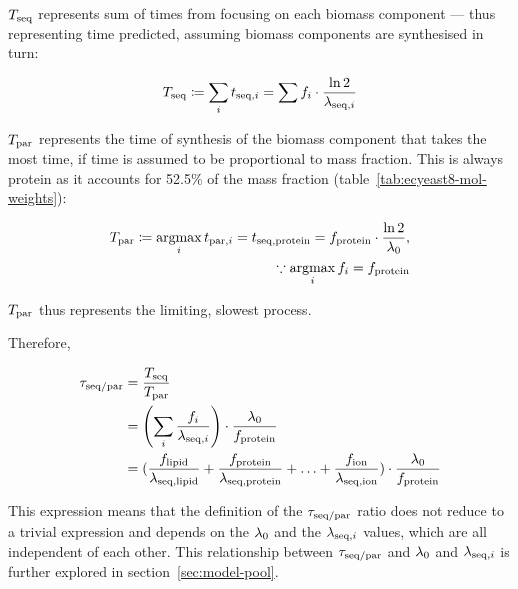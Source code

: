 $T_{\mathrm{seq}}$ represents sum of times from focusing on each biomass component --- thus representing time predicted, assuming biomass components are synthesised in turn:

\begin{equation}
  T_{\mathrm{seq}} \coloneqq \sum_{i} t_{\mathrm{seq},i} = \sum f_{i} \cdot \frac{\ln 2}{\lambda_{\mathrm{seq},i}}
  \label{eq:model-a}
\end{equation}

$T_{\mathrm{par}}$ represents the time of synthesis of the biomass component that takes the most time, if time is assumed to be proportional to mass fraction.
This is always protein as it accounts for 52.5\% of the mass fraction (table~\ref{tab:ecyeast8-mol-weights}):

\begin{equation}
  \begin{aligned}
    T_{\mathrm{par}} \coloneqq \operatorname*{argmax}_{i} t_{\mathrm{par},i} = t_{\mathrm{seq},\mathrm{protein}} = f_{\mathrm{protein}} \cdot \frac{\ln 2}{\lambda_{0}},\\
    \because \operatorname*{argmax}_{i} f_{i} = f_{\mathrm{protein}}
  \end{aligned}
  \label{eq:model-b}
\end{equation}

$T_{\mathrm{par}}$ thus represents the limiting, slowest process.

Therefore,

\begin{equation}
  \begin{aligned}
    \tau_{\mathrm{seq}/\mathrm{par}} &= \frac{T_{\mathrm{seq}}}{T_{\mathrm{par}}} \\
    & = \left( \sum_i \frac{f_i}{\lambda_{\mathrm{seq},i}} \right) \cdot \frac{\lambda_{0}}{f_{\mathrm{protein}}} \\
    & = (\frac{f_{\mathrm{lipid}}}{\lambda_{\mathrm{seq},\mathrm{lipid}}} + \frac{f_{\mathrm{protein}}}{\lambda_{\mathrm{seq},\mathrm{protein}}} + \ldots + \frac{f_{\mathrm{ion}}}{\lambda_{\mathrm{seq},\mathrm{ion}}}) \cdot \frac{\lambda_{0}}{f_{\mathrm{protein}}}
    \end{aligned}
  \label{eq:model-ratio}
\end{equation}

This expression means that the definition of the $\tau_{\mathrm{seq}/\mathrm{par}}$ ratio does not reduce to a trivial expression and depends on the $\lambda_{0}$ and the $\lambda_{\mathrm{seq},i}$ values, which are all independent of each other.
This relationship between $\tau_{\mathrm{seq}/\mathrm{par}}$ and $\lambda_{0}$ and $\lambda_{\mathrm{seq},i}$ is further explored in section~\ref{sec:model-pool}.

